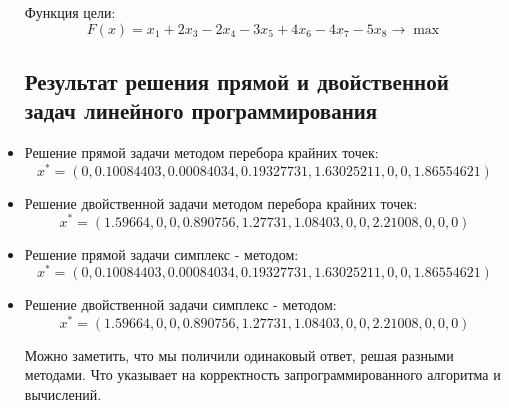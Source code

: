 \documentclass[../body.tex]{subfiles}
\begin{document}
\begin{itemize}
Функция цели: $$F(x)=x_1+2x_3-2x_4-3x_5+4x_6-4x_7-5x_8\longrightarrow \max
$$	
 \subsection{Результат решения прямой и двойственной задач линейного программирования}
\item Решение прямой задачи методом перебора крайних точек: 
$$x^{*}=(0, 0.10084403, 0.00084034, 0.19327731, 1.63025211, 0, 0, 1.86554621)$$
\item Решение двойственной задачи методом перебора крайних точек: 
$$x^{*}=(1.59664, 0, 0, 0.890756, 1.27731, 1.08403, 0,0,2.21008, 0,0,0)$$
\item Решение прямой задачи симплекс - методом:
$$x^{*}=(0, 0.10084403, 0.00084034, 0.19327731, 1.63025211, 0, 0, 1.86554621)$$
\item  Решение двойственной задачи симплекс - методом:
$$x^{*}=(1.59664, 0, 0, 0.890756, 1.27731, 1.08403, 0,0,2.21008, 0,0,0)$$

Можно заметить, что мы поличили одинаковый ответ, решая разными методами. Что указывает на корректность запрограммированного алгоритма и вычислений.

\end{itemize}
	
\end{document}

